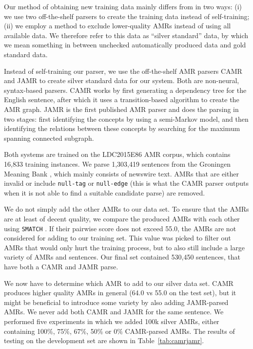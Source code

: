 \documentclass[a4paper,10pt,twoside]{article}
\begin{document}
Our method of obtaining new training data mainly differs from  in two ways: 
(i) we use two off-the-shelf parsers to create the training data instead of self-training;
(ii) we employ a method to exclude lower-quality AMRs instead of using all available data. 
We therefore refer to this data as ``silver standard'' data, by which we mean something in between unchecked automatically produced data and gold standard data. 

Instead of self-training our parser, we use the off-the-shelf AMR parsers CAMR \cite{CAMR:15} and JAMR \cite{JAMR:14} to create silver standard data for our system. Both are non-neural, syntax-based parsers. CAMR works by first generating a dependency tree for the English sentence, after which it uses a transition-based algorithm to create the AMR graph. JAMR is the first published AMR parser and does the parsing in two stages: first identifying the concepts by using a semi-Markov model, and then identifying the relations between these concepts by searching for the maximum spanning connected subgraph.

Both systems are trained on the LDC2015E86 AMR corpus, which contains 16,833 training instances. We parse 1,303,419 sentences from the Groningen Meaning Bank \cite{gmb:lrec}, which mainly consists of newswire text. AMRs that are either invalid or include \texttt{null-tag} or \texttt{null-edge} (this is what the CAMR parser outputs when it is not able to find a suitable candidate parse) are removed.

We do not simply add the other AMRs to our data set. To ensure that the AMRs are at least of decent quality, we compare the produced AMRs with each other using \texttt{SMATCH} \cite{smatch:2013}. If their pairwise score does not exceed 55.0, the AMRs are not considered for adding to our training set. This value was picked to filter out AMRs that would only hurt the training process, but to also still include a large variety of AMRs and sentences. Our final set contained 530,450 sentences, that have both a CAMR and JAMR parse. 

We now have to determine which AMR to add to our silver data set. CAMR produces higher quality AMRs in general (64.0 vs 55.0 on the test set), but it might be beneficial to introduce some variety by also adding JAMR-parsed AMRs. We never add both CAMR and JAMR for the same sentence. We performed five experiments in which we added 100k silver AMRs, either containing 100\%, 75\%, 67\%, 50\% or 0\% CAMR-parsed AMRs. The results of testing on the development set are shown in Table~\ref{tab:camrjamr}. 
\end{document}

